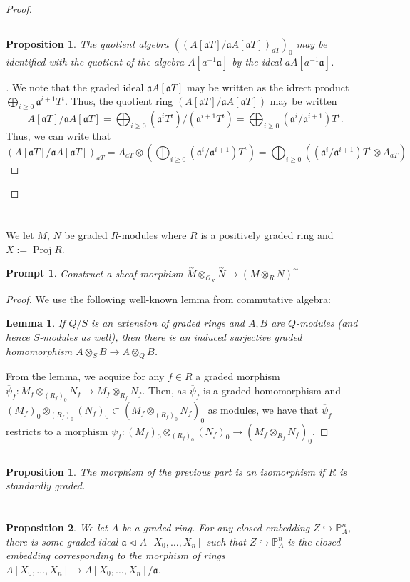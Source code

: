\documentclass[english,letter,doublesided]{article}
\newcommand{\OO}{\mathcal{O}}
\newcommand{\PP}{\mathbb{P}}
\newcommand{\afr}{\mathfrak{a}}
\newcommand{\into}{\hookrightarrow}
\newenvironment{subproof}[1][\proofname]{%
	\renewcommand{\qedsymbol}{$\blacksquare$}%
	\begin{proof}[#1]%
	}{%
	\end{proof}%
}
\newcommand{\prob}[1]{\setcounter{section}{#1-1}\section{}}
\newcommand{\prt}[1]{\setcounter{subsection}{#1-1}\subsection{}}
\newtheorem{lemma}[thm]{Lemma}
\newtheorem{prop}[thm]{Proposition}
\newtheorem*{prop*}{Proposition}
\newtheorem*{prompt*}{Prompt}
\theoremstyle{remark}
\theoremstyle{definition}
\renewcommand{\bar}{\overline}
\DeclareMathOperator{\proj}{Proj}
\newcommand{\ass}[1]{\overset{\sim}{#1}}
\begin{document}
\begin{proof}
\prt{2}
\begin{prop}
	The quotient algebra $((A[\afr T]/\afr A[\afr T])_{aT})_0$ may be identified with the quotient of the algebra $A[a^{-1}\afr]$ by the ideal $aA[a^{-1}\afr]$.
\end{prop}
\begin{subproof}
	We note that the graded ideal $\afr A[\afr T]$ may be written as the idrect product $\bigoplus_{i\geq 0}\afr^{i+1}T^i$. Thus, the quotient ring $(A[\afr T]/\afr A[\afr T])$ may be written $$A[\afr T]/\afr A[\afr T]=\bigoplus_{i\geq 0} (\afr^iT^i)/(\afr^{i+1}T^i)=\bigoplus_{i\geq 0}(\afr^i/\afr^{i+1})T^i.$$
	Thus, we can write that $$(A[\afr T]/\afr A[\afr T])_{aT}=A_{aT}\otimes\left(\bigoplus_{i\geq 0}(\afr^i/\afr^{i+1})T^i\right)=\bigoplus_{i\geq 0}\left((\afr^i/\afr^{i+1})T^i\otimes A_{aT}\right)$$
	
\end{subproof}
\end{proof}
\prob{3} We let $M$, $N$ be graded $R$-modules where $R$ is a positively graded ring and $X:=\proj R$. 
\begin{prompt*}
	Construct a sheaf morphism $\ass{M}\otimes_{\OO_X}\ass{N}\to {(M\otimes_R N)}^\sim$
\end{prompt*}
\begin{proof}
	We use the following well-known lemma from commutative algebra:\begin{lemma}\label{ringex}
		If $Q/S$ is an extension of graded rings and $A,B$ are $Q$-modules (and hence $S$-modules as well), then there is an induced surjective graded homomorphism $A\otimes_S B\to A\otimes_Q B$.
	\end{lemma}
From the lemma, we acquire for any $f\in R$ a graded morphism $\bar\psi_f:M_f\otimes_{(R_f)_0} N_f\to M_f\otimes_{R_f}N_f$. Then, as $\bar\psi_f$ is a graded homomorphism and $(M_f)_0\otimes_{(R_f)_0}(N_f)_0\subset (M_f\otimes_{(R_f)_0}N_f)_0$ as modules, we have that $\bar\psi_f$ restricts to a morphism $\psi_f: (M_f)_0\otimes_{(R_f)_0}(N_f)_0\to (M_f\otimes_{R_f} N_f)_0$.
\end{proof}
\prt{2}
\begin{prop*}
	The morphism of the previous part is an isomorphism if $R$ is standardly graded.
\end{prop*}
	\prob{4}
	\begin{prop*} We let $A$ be a graded ring.
		For any closed embedding $Z\into \PP^n_A$, there is some graded ideal $\afr\triangleleft A[X_0,\dots,X_n]$ such that $Z\into \PP^n_A$ is the closed embedding corresponding to the morphism of rings $A[X_0,\dots,X_n]\to A[X_0,\dots,X_n]/\afr$.
	\end{prop*}
\end{document}
